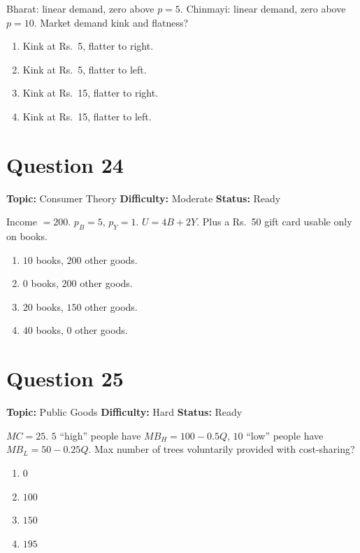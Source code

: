\documentclass[11pt]{article}
\begin{document}
Bharat: linear demand, zero above $p=5$. Chinmayi: linear demand, zero above $p=10$. Market demand kink and flatness?

\begin{enumerate}[label=(\Alph*)]
\item Kink at Rs.~5, flatter to right.
\item Kink at Rs.~5, flatter to left.
\item Kink at Rs.~15, flatter to right.
\item Kink at Rs.~15, flatter to left.
\end{enumerate}

\newpage

\section*{Question 24}


\noindent\textbf{Topic:} Consumer Theory \quad \textbf{Difficulty:} Moderate \quad \textbf{Status:} Ready



Income $= 200$. $p_B = 5$, $p_Y = 1$. $U = 4B + 2Y$. Plus a Rs.\ 50 gift card usable only on books.
\begin{enumerate}[label=(\Alph*)]
\item $10$ books, $200$ other goods.
\item $0$ books, $200$ other goods.
\item $20$ books, $150$ other goods.
\item $40$ books, $0$ other goods.
\end{enumerate}

\newpage

\section*{Question 25}


\noindent\textbf{Topic:} Public Goods \quad \textbf{Difficulty:} Hard \quad \textbf{Status:} Ready



$MC = 25$. $5$ ``high'' people have $MB_H = 100 - 0.5Q$, $10$ ``low'' people have $MB_L = 50 - 0.25Q$. Max number of trees voluntarily provided with cost-sharing?

\begin{enumerate}[label=(\Alph*)]
\item $0$ \item $100$ \item $150$ \item $195$
\end{enumerate}
\end{document}
